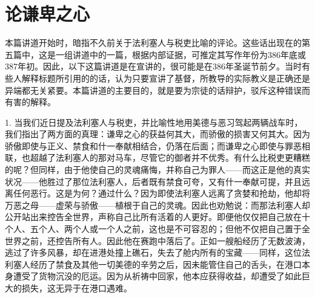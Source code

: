 
\chapter{论谦卑之心}


本篇讲道开始时，暗指不久前关于法利塞人与税吏比喻的评论。这些话出现在的第五篇中，这是一组讲道中的一篇，根据内部证据，可推定其写作年份为386年底或387年初。因此，以下这篇讲道是在宣讲的，很可能是在386年圣诞节前夕。当时有些人解释标题所引用的的话，认为只要宣讲了基督，所教导的实际教义是正确还是异端都无关紧要。本篇讲道的主要目的，就是要为宗徒的话辩护，驳斥这种错误而有害的解释。\par

1. 当我们近日提及法利塞人与税吏，并比喻性地用美德与恶习驾起两辆战车时，我们指出了两方面的真理：谦卑之心的获益何其大，而骄傲的损害又何其大。因为骄傲即使与正义、禁食和什一奉献相结合，仍落在后面；而谦卑之心即使与罪恶相联，也超越了法利塞人的那对马车，尽管它的御者并不优秀。有什么比税吏更糟糕的呢？但同样，由于他使自己的灵魂痛悔，并称自己为罪人——而这正是他的真实状况——他胜过了那位法利塞人，后者既有禁食可夸，又有什一奉献可提，并且远离任何恶行。这是为何？通过什么？因为即使法利塞人远离了贪婪和抢劫，他却将万恶之母——虚荣与骄傲——植根于自己的灵魂。因此也劝勉说：而那法利塞人却公开站出来控告全世界，声称自己比所有活着的人更好。即便他仅仅把自己放在十个人、五个人、两个人或一个人之前，这也是不可容忍的；但他不仅把自己置于全世界之前，还控告所有人。因此他在赛跑中落后了。正如一艘船经历了无数波涛，逃过了许多风暴，却在进港处撞上礁石，失去了舱内所有的宝藏——同样，这位法利塞人经历了禁食及其他一切美德的辛劳之后，因未能管住自己的舌头，在港口本身遭受了货物沉没的厄运。因为从祈祷中回家，他本应获得收益，却遭受了如此巨大的损失，这无异于在港口遇难。\par

